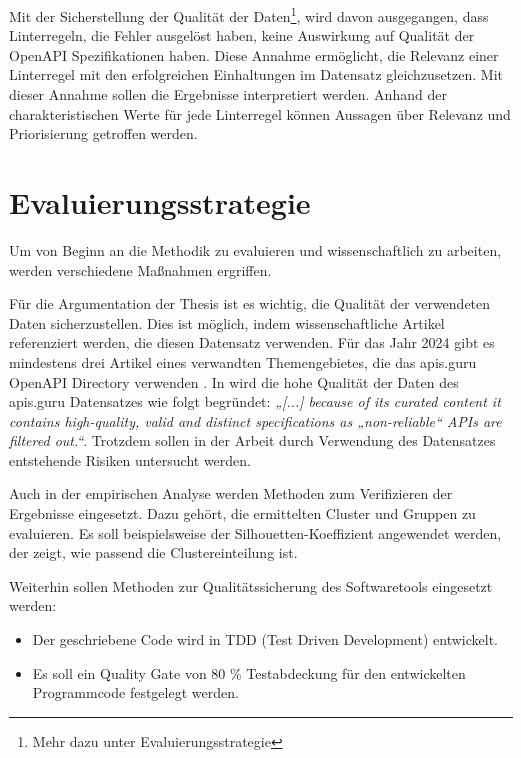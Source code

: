 Mit der Sicherstellung der Qualität der Daten\footnote{Mehr dazu unter Evaluierungsstrategie}, wird davon ausgegangen, dass Linterregeln, die Fehler ausgelöst haben, keine Auswirkung auf Qualität der OpenAPI Spezifikationen haben. Diese Annahme ermöglicht, die Relevanz einer Linterregel mit den erfolgreichen Einhaltungen im Datensatz gleichzusetzen. Mit dieser Annahme sollen die Ergebnisse interpretiert werden. Anhand der charakteristischen Werte für jede Linterregel können Aussagen über Relevanz und Priorisierung getroffen werden.




\section{Evaluierungsstrategie}
Um von Beginn an die Methodik zu evaluieren und wissenschaftlich zu arbeiten, werden verschiedene Maßnahmen ergriffen.

Für die Argumentation der Thesis ist es wichtig, die Qualität der verwendeten Daten sicherzustellen.
Dies ist möglich, indem wissenschaftliche Artikel referenziert werden, die diesen Datensatz verwenden. Für das Jahr 2024 gibt es mindestens drei Artikel eines verwandten Themengebietes, die das apis.guru OpenAPI Directory verwenden \parencite{bogner_restruler_2024}\parencite{serbout_apistic_2024}\parencite{kim_leveraging_2024}. In \parencite{serbout_apistic_2024} wird die hohe Qualität der Daten des apis.guru Datensatzes wie folgt begründet: \textit{„[...] because of its curated content it contains
high-quality, valid and distinct specifications as „non-reliable“ APIs
are filtered out.“}. Trotzdem sollen in der Arbeit durch Verwendung des Datensatzes entstehende Risiken untersucht werden.

Auch in der empirischen Analyse werden Methoden zum Verifizieren der Ergebnisse eingesetzt. Dazu gehört, die ermittelten Cluster und Gruppen zu evaluieren. Es soll beispielsweise der Silhouetten-Koeffizient angewendet werden, der zeigt, wie passend die Clustereinteilung ist.

Weiterhin sollen Methoden zur Qualitätssicherung des Softwaretools eingesetzt werden:
\begin{itemize}
    \item Der geschriebene Code wird in TDD (Test Driven Development) entwickelt.
    \item Es soll ein Quality Gate von 80 \% Testabdeckung für den entwickelten Programmcode festgelegt werden.
\end{itemize}


